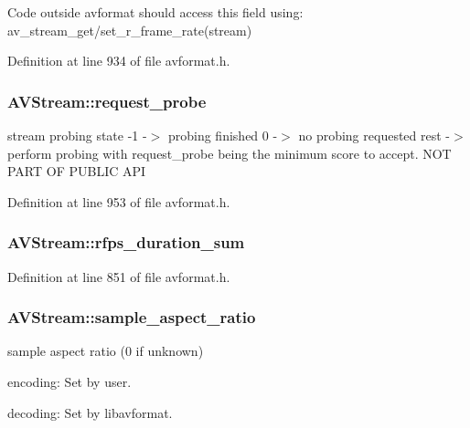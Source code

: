 Code outside avformat should access this field using\+: av\+\_\+stream\+\_\+get/set\+\_\+r\+\_\+frame\+\_\+rate(stream) 

Definition at line 934 of file avformat.\+h.

\subsubsection[{\texorpdfstring{request\+\_\+probe}{request_probe}}]{ A\+V\+Stream\+::request\+\_\+probe}\hypertarget{struct_a_v_stream_ab31d9fb6014bb52726ec3144a5d11218}{}\label{struct_a_v_stream_ab31d9fb6014bb52726ec3144a5d11218}
stream probing state -\/1 -\/$>$ probing finished 0 -\/$>$ no probing requested rest -\/$>$ perform probing with request\+\_\+probe being the minimum score to accept. N\+OT P\+A\+RT OF P\+U\+B\+L\+IC A\+PI 

Definition at line 953 of file avformat.\+h.

\subsubsection[{\texorpdfstring{rfps\+\_\+duration\+\_\+sum}{rfps_duration_sum}}]{ A\+V\+Stream\+::rfps\+\_\+duration\+\_\+sum}\hypertarget{struct_a_v_stream_afeec9883900710b1e9fc241dd6c32a20}{}\label{struct_a_v_stream_afeec9883900710b1e9fc241dd6c32a20}


Definition at line 851 of file avformat.\+h.

\subsubsection[{\texorpdfstring{sample\+\_\+aspect\+\_\+ratio}{sample_aspect_ratio}}]{ A\+V\+Stream\+::sample\+\_\+aspect\+\_\+ratio}\hypertarget{struct_a_v_stream_a3f19c60ac6da237cd10e4d97150c118e}{}\label{struct_a_v_stream_a3f19c60ac6da237cd10e4d97150c118e}
sample aspect ratio (0 if unknown)
\begin{DoxyItemize}
\item encoding\+: Set by user.
\item decoding\+: Set by libavformat. 
\end{DoxyItemize}

